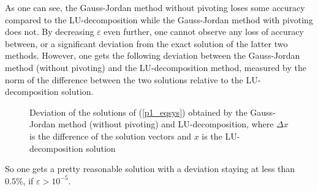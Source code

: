 \documentclass[12pt, a4paper]{article}
\begin{document}
  \noindent
  As one can see, the Gauss-Jordan method without pivoting loses some accuracy compared to the LU-decomposition while the Gauss-Jordan method with pivoting does not. By decreasing $\varepsilon$ even further, one cannot observe any loss of accuracy between, or a significant deviation from the exact solution of the latter two methods. However, one gets the following deviation between the Gauss-Jordan method (without pivoting) and the LU-decomposition method, measured by the norm of the difference between the two solutions relative to the LU-decomposition solution.

  \begin{figure}[ht]
    \begin{center}
      
      \caption{Deviation of the solutions of (\ref{p1_eqsys}) obtained by the Gauss-Jordan method (without pivoting) and LU-decomposition, where $\Delta x$ is the difference of the solution vectors and $x$ is the LU-decomposition solution}
    \end{center}
  \end{figure}

  \newpage\noindent
  So one gets a pretty reasonable solution with a deviation staying at less than $0.5 \%$, if $\varepsilon > 10^{-5}$.
\end{document}
